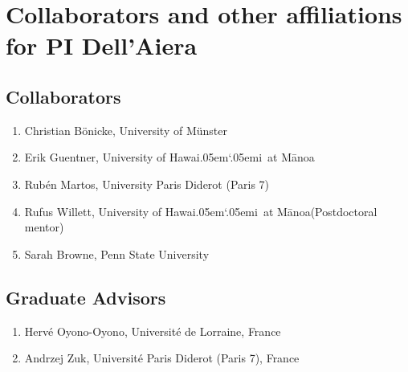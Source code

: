 \documentclass[11pt]{article}
\newcommand{\Manoa}{M\=anoa}
\newcommand{\Hawaii}{Hawai\kern.05em`\kern.05em\relax i}
\begin{document}
\section*{Collaborators and other affiliations for PI Dell'Aiera}

\subsection*{Collaborators}

\begin{enumerate}
\item Christian B\"onicke, University of M\"{u}nster
\item Erik Guentner, University of \Hawaii~at \Manoa 
\item Rub\'en Martos, University Paris Diderot (Paris 7)
\item Rufus Willett, University of \Hawaii~at \Manoa (Postdoctoral mentor)
\item Sarah Browne, Penn State University
\end{enumerate}

\subsection*{Graduate Advisors}

\begin{enumerate}
\item Herv\'e Oyono-Oyono, Universit\'e de Lorraine, France
\item Andrzej Zuk, Universit\'e Paris Diderot (Paris 7), France
\end{enumerate}
\end{document}
